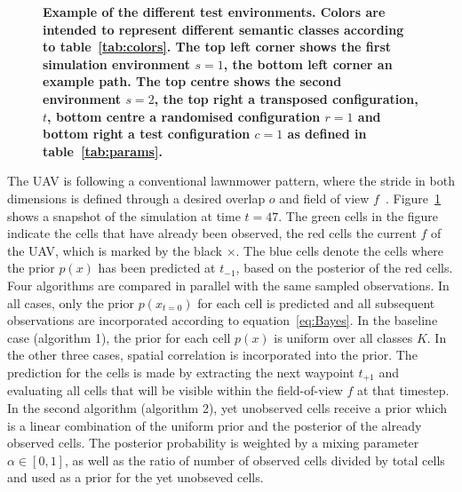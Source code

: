 \documentclass[twocolumn,letterpaper]{IEEEAerospaceCLS}  %
\begin{document}
\begin{figure}[t]
    \centering
    \caption{\bf{
        Example of the different test environments. Colors are intended to represent different semantic classes according to table~\ref{tab:colors}. The top left corner shows the first simulation environment $s=1$, the bottom left corner an example path. The top centre shows the second environment $s=2$, the top right a transposed configuration, $t$, bottom centre a randomised configuration $r=1$ and bottom right a test configuration $c=1$ as defined in table~\ref{tab:params}.
    }}
    \label{fig:SimCase}
\end{figure}
The UAV is following a conventional lawnmower pattern, where the stride in both dimensions is defined through a desired overlap $o$ and field of view $f$~\cite{shetty_implementation_2020}. Figure~\ref{fig:SimCase} shows a snapshot of the simulation at time $t=47$. The green cells in the figure indicate the cells that have already been observed, the red cells the current $f$ of the UAV, which is marked by the black $\times$. The blue cells denote the cells where the prior $p(x)$ has been predicted at $t_{-1}$, based on the posterior of the red cells.\\ 
Four algorithms are compared in parallel with the same sampled observations. In all cases, only the prior $p(x_{t=0})$ for each cell is predicted and all subsequent observations are incorporated according to equation~\ref{eq:Bayes}. In the baseline case (algorithm 1), the prior for each cell $p(x)$ is uniform over all classes $K$. In the other three cases, spatial correlation is incorporated into the prior. The prediction for the cells is made by extracting the next waypoint $t_{+1}$ and evaluating all cells that will be visible within the field-of-view $f$ at that timestep. In the second algorithm (algorithm 2), yet unobserved cells receive a prior which is a linear combination of the uniform prior and the posterior of the already observed cells. The posterior probability is weighted by a mixing parameter $\alpha \in [0, 1]$, as well as the ratio of number of observed cells divided by total cells and used as a prior for the yet unobseved cells.\\
\end{document}
